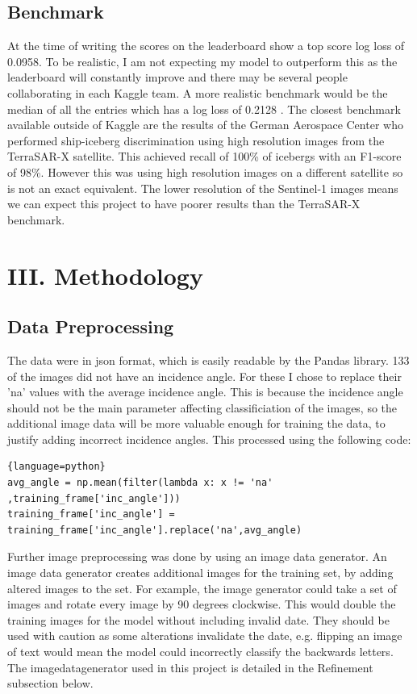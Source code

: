 \documentclass{article}
\begin{document}
\subsection{Benchmark}
At the time of writing the scores on the leaderboard show a top score log loss of 0.0958. To be realistic, I am not expecting my model to outperform this as the leaderboard will constantly improve and there may be several people collaborating in each Kaggle team. A more realistic benchmark would be the median of all the entries which has a log loss of 0.2128 \cite{kaggle}.
The closest benchmark available outside of Kaggle are the results of the German Aerospace Center \cite{bentes} who performed ship-iceberg discrimination using high resolution images from the TerraSAR-X satellite. This achieved recall of 100\% of icebergs with an F1-score of 98\%. However this was using high resolution images on a different satellite so is not an exact equivalent. The lower resolution of the Sentinel-1 images means we can expect this project to have poorer results than the TerraSAR-X benchmark. 

\section{III. Methodology}
\subsection{Data Preprocessing}
The data were in json format, which is easily readable by the Pandas library. 133 of the images did not have an incidence angle. For these I chose to replace their 'na' values with the average incidence angle. This is because the incidence angle should not be the main parameter affecting classificiation of the images, so the additional image data will be more valuable enough for training the data, to justify adding incorrect incidence angles. This processed using the following code:
\begin{lstlisting}{language=python}
avg_angle = np.mean(filter(lambda x: x != 'na' ,training_frame['inc_angle']))
training_frame['inc_angle'] = training_frame['inc_angle'].replace('na',avg_angle)
\end{lstlisting}

Further image preprocessing was done by using an image data generator. An image data generator creates additional images for the training set, by adding altered images to the set. For example, the image generator could take a set of images and rotate every image by 90 degrees clockwise. This would double the training images for the model without including invalid date. They should be used with caution as some alterations invalidate the date, e.g. flipping an image of text would mean the model could incorrectly classify the backwards letters. The imagedatagenerator used in this project is detailed in the Refinement subsection below.
\end{document}
